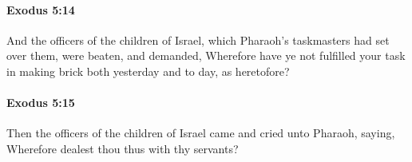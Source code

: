 		\paragraph{Exodus 5:14} %
			\label{EXODUS-5-14}

			And the officers of the children of Israel, which Pharaoh's taskmasters had set over them, were beaten, and demanded, Wherefore have ye not fulfilled your task in making brick both yesterday and to day, as heretofore?


		\paragraph{Exodus 5:15} %
			\label{EXODUS-5-15}

			Then the officers of the children of Israel came and cried unto Pharaoh, saying, Wherefore dealest thou thus with thy servants?


